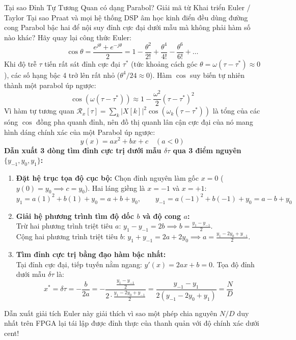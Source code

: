 \documentclass[11pt,a4paper]{article}
\begin{document}
\begin{feynmanbox}{Tại sao Đỉnh Tự Tương Quan có dạng Parabol? Giải mã từ Khai triển Euler / Taylor}
Tại sao Praat và mọi hệ thống DSP âm học kinh điển đều dùng đường cong Parabol bậc hai để nội suy đỉnh cực đại dưới mẫu mà không phải hàm số nào khác? Hãy quay lại công thức Euler:
\[
\cos\theta = \frac{e^{j\theta} + e^{-j\theta}}{2} = 1 - \frac{\theta^2}{2!} + \frac{\theta^4}{4!} - \frac{\theta^6}{6!} + \dots
\]
Khi độ trễ $\tau$ tiến rất sát đỉnh cực đại $\tau^*$ (tức khoảng cách góc $\theta = \omega(\tau - \tau^*) \approx 0$), các số hạng bậc 4 trở lên rất nhỏ ($\theta^4 / 24 \approx 0$). Hàm $\cos$ suy biến tự nhiên thành một parabol úp ngược:
\[
\cos(\omega(\tau - \tau^*)) \approx 1 - \frac{\omega^2}{2} (\tau - \tau^*)^2
\]
Vì hàm tự tương quan $\mathcal{R}_x[\tau] = \sum_k |X[k]|^2 \cos(\omega_k(\tau - \tau^*))$ là tổng của các sóng $\cos$ đồng pha quanh đỉnh, nên đồ thị quanh lân cận cực đại của nó mang hình dáng chính xác của một Parabol úp ngược:
\[
y(x) = ax^2 + bx + c \quad (a < 0)
\]
\textbf{Dẫn xuất 3 dòng tìm đỉnh cực trị dưới mẫu $\delta\tau$ qua 3 điểm nguyên $\{y_{-1}, y_0, y_1\}$:}
\begin{enumerate}
    \setlength{\itemsep}{1pt}
    \item \textbf{Đặt hệ trục tọa độ cục bộ:} Chọn đỉnh nguyên làm gốc $x = 0$ ($y(0) = y_0 \implies c = y_0$). Hai láng giềng là $x = -1$ và $x = +1$:
    \[
    y_1 = a(1)^2 + b(1) + y_0 = a + b + y_0, \qquad y_{-1} = a(-1)^2 + b(-1) + y_0 = a - b + y_0
    \]
    \item \textbf{Giải hệ phương trình tìm độ dốc $b$ và độ cong $a$:} \\
    Trừ hai phương trình triệt tiêu $a$: $y_1 - y_{-1} = 2b \implies b = \frac{y_1 - y_{-1}}{2}$. \\
    Cộng hai phương trình triệt tiêu $b$: $y_1 + y_{-1} = 2a + 2y_0 \implies a = \frac{y_1 - 2y_0 + y_{-1}}{2}$.
    \item \textbf{Tìm đỉnh cực trị bằng đạo hàm bậc nhất:} \\
    Tại đỉnh cực đại, tiếp tuyến nằm ngang: $y'(x) = 2ax + b = 0$. Tọa độ đỉnh dưới mẫu $\delta\tau$ là:
    \begin{equation}
    x^* = \delta\tau = -\frac{b}{2a} = -\frac{\frac{y_1 - y_{-1}}{2}}{2 \cdot \frac{y_1 - 2y_0 + y_{-1}}{2}} = \frac{y_{-1} - y_1}{2(y_{-1} - 2y_0 + y_1)} = \frac{N}{D}
    \end{equation}
\end{enumerate}
Dẫn xuất giải tích Euler này giải thích vì sao một phép chia nguyên $N / D$ duy nhất trên FPGA lại tái lập được đỉnh thực của thanh quản với độ chính xác dưới cent!
\end{feynmanbox}
\end{document}
